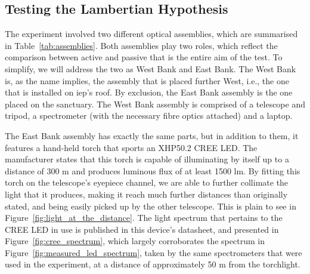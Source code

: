 \subsection{Testing the Lambertian Hypothesis}%
\label{sub:methods_experiment}

The experiment involved two different optical assemblies, which are
summarised in Table~\ref{tab:assemblies}. Both assemblies play two
roles, which reflect the comparison between active and passive that is
the entire aim of the test. To simplify, we will address the two as West
Bank and East Bank. The West Bank is, as the name implies, the assembly
that is placed further West, i.e., the one that is installed on
\gls{iep}'s roof. By exclusion, the East Bank assembly is the one placed
on the sanctuary. The West Bank assembly is comprised of a telescope and
tripod, a spectrometer (with the necessary fibre optics attached) and a
laptop. 

The East Bank assembly has exactly the same parts, but in addition to
them, it features a hand-held torch that sports an XHP50.2 CREE LED. The
manufacturer states that this torch is capable of illuminating by itself
up to a distance of 300 m and produces luminous flux of at least 1500
lm. By fitting this torch on the telescope's eyepiece channel, we are
able to further collimate the light that it produces, making it reach
much further distances than originally stated, and being easily picked
up by the other telescope. This is plain to see in
Figure~\ref{fig:light_at_the_distance}. The light spectrum that pertains
to the CREE LED in use is published in this device's datasheet, and
presented in Figure~\ref{fig:cree_spectrum}, which largely corroborates
the spectrum in Figure~\ref{fig:measured_led_spectrum}, taken by the
same spectrometers that were used in the experiment, at a distance of
approximately 50 m from the torchlight. 

